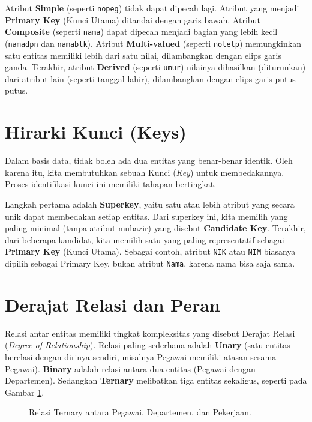 \documentclass[11pt,a4paper]{article}
\begin{document}
Atribut \textbf{Simple} (seperti \texttt{nopeg}) tidak dapat dipecah lagi. Atribut yang menjadi \textbf{Primary Key} (Kunci Utama) ditandai dengan garis bawah. Atribut \textbf{Composite} (seperti \texttt{nama}) dapat dipecah menjadi bagian yang lebih kecil (\texttt{namadpn} dan \texttt{namablk}). Atribut \textbf{Multi-valued} (seperti \texttt{notelp}) memungkinkan satu entitas memiliki lebih dari satu nilai, dilambangkan dengan elips garis ganda. Terakhir, atribut \textbf{Derived} (seperti \texttt{umur}) nilainya dihasilkan (diturunkan) dari atribut lain (seperti tanggal lahir), dilambangkan dengan elips garis putus-putus.

\section{Hirarki Kunci (Keys)}

Dalam basis data, tidak boleh ada dua entitas yang benar-benar identik. Oleh karena itu, kita membutuhkan sebuah Kunci (\textit{Key}) untuk membedakannya. Proses identifikasi kunci ini memiliki tahapan bertingkat.

Langkah pertama adalah \textbf{Superkey}, yaitu satu atau lebih atribut yang secara unik dapat membedakan setiap entitas. Dari superkey ini, kita memilih yang paling minimal (tanpa atribut mubazir) yang disebut \textbf{Candidate Key}. Terakhir, dari beberapa kandidat, kita memilih satu yang paling representatif sebagai \textbf{Primary Key} (Kunci Utama). Sebagai contoh, atribut \texttt{NIK} atau \texttt{NIM} biasanya dipilih sebagai Primary Key, bukan atribut \texttt{Nama}, karena nama bisa saja sama.

\section{Derajat Relasi dan Peran}

Relasi antar entitas memiliki tingkat kompleksitas yang disebut Derajat Relasi (\textit{Degree of Relationship}). Relasi paling sederhana adalah \textbf{Unary} (satu entitas berelasi dengan dirinya sendiri, misalnya Pegawai memiliki atasan sesama Pegawai). \textbf{Binary} adalah relasi antara dua entitas (Pegawai dengan Departemen). Sedangkan \textbf{Ternary} melibatkan tiga entitas sekaligus, seperti pada Gambar \ref{fig:ternary}.

\begin{figure}[H]
	\centering
	\caption{Relasi Ternary antara Pegawai, Departemen, dan Pekerjaan.}
	\label{fig:ternary}
\end{figure}
\end{document}
